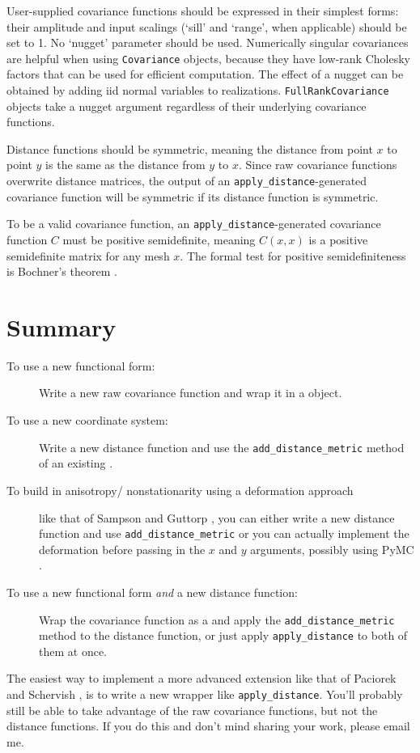 User-supplied covariance functions should be expressed in their simplest forms: their amplitude and input scalings (`sill' and `range', when applicable) should be set to 1. No `nugget' parameter should be used. Numerically singular covariances are helpful when using \texttt{Covariance} objects, because they have low-rank Cholesky factors that can be used for efficient computation. The effect of a nugget can be obtained by adding iid normal variables to realizations. \texttt{FullRankCovariance} objects take a nugget argument regardless of their underlying covariance functions.

Distance functions should be symmetric, meaning the distance from point $x$ to point $y$ is the same as the distance from $y$ to $x$. Since raw covariance functions overwrite distance matrices, the output of an \texttt{apply_distance}-generated covariance function will be symmetric if its distance function is symmetric.

To be a valid covariance function, an \texttt{apply_distance}-generated covariance function $C$ must be positive semidefinite, meaning $C(x,x)$ is a positive semidefinite matrix for any mesh $x$. The formal test for positive semidefiniteness is Bochner's theorem \cite{stein}.%



\section{Summary}\label{sec:cookbook}
\begin{description}
    \item[To use a new functional form:] Write a new raw covariance function and wrap it in a  object.
    \item[To use a new coordinate system:] Write a new distance function and use the \texttt{add_distance_metric} method of an existing .
    \item[To build in anisotropy/ nonstationarity using a deformation approach] like that of Sampson and Guttorp \cite{sampson}, you can either write a new distance function and use \texttt{add_distance_metric} or you can actually implement the deformation before passing in the $x$ and $y$ arguments, possibly using PyMC .
    \item[To use a new functional form \emph{and} a new distance function:] Wrap the covariance function as a  and apply the \texttt{add_distance_metric} method to the distance function, or just apply \texttt{apply_distance} to both of them at once.
\end{description}

The easiest way to implement a more advanced extension like that of Paciorek and Schervish \cite{pachische} , is to write a new wrapper like \texttt{apply_distance}. You'll probably still be able to take advantage of the raw covariance functions, but not the distance functions. If you do this and don't mind sharing your work, please email me.

